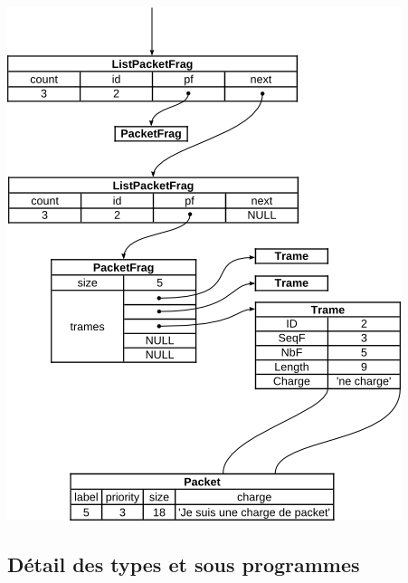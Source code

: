 \documentclass[a4paper,11pt]{article}
\begin{document}
\includegraphics{s1.png}

\subsection{Détail des types et sous programmes}
\end{document}
